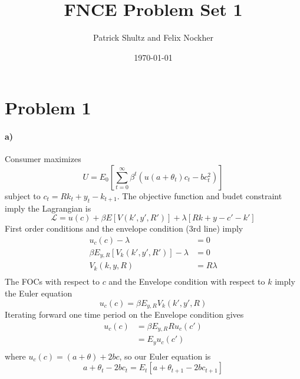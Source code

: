 \documentclass[12pt,letter]{article}
\begin{document}
\title{FNCE Problem Set 1}
\author{Patrick Shultz and Felix Nockher}
\date{\today}
\maketitle 
\section*{Problem 1}
\paragraph{a)}
Consumer maximizes
\begin{equation*}
	U = E_0\left[ \sum_{t = 0}^{\infty} \beta^t( u(a+ \theta_t)c_t - bc_t^2)\right] 
\end{equation*}
subject to $c_t = Rk_t + y_t - k_{t+1}$. The objective function and budet constraint imply the Lagrangian is
\begin{equation}
	\mathcal{L} = u(c) +\beta E\left[V(k', y', R') \right] + \lambda \left[Rk + y - c'-k' \right]  
\end{equation}
First order conditions and the envelope condition (3rd line) imply
\begin{equation}
	\begin{split}
	 u_c(c) - \lambda &=0\\
	\beta E_{y, R}\left[ V_k(k', y', R')\right]-\lambda &= 0\\
	 V_k(k, y, R) &= R\lambda\\  
	\end{split}
\end{equation}
The FOCs with respect to $c$ and the Envelope condition with respect to $k$ imply the Euler equation 
\begin{equation}
	u_c(c) = \beta E_{y, R} V_k(k', y', R)
\end{equation}
Iterating forward one time period on the Envelope condition gives
\begin{equation}
\begin{split}
u_c(c) &= \beta E_{y, R} R u_c(c')\\
&= E_{y} u_c(c')\\
\end{split}
\end{equation}
where $u_c(c) = (a+\theta) + 2bc$, so our Euler equation is 
\begin{equation}
a + \theta_t - 2bc_t = E_t\left[a + \theta_{t+1} -2bc_{t+1} \right]  
\end{equation}
\end{document}
